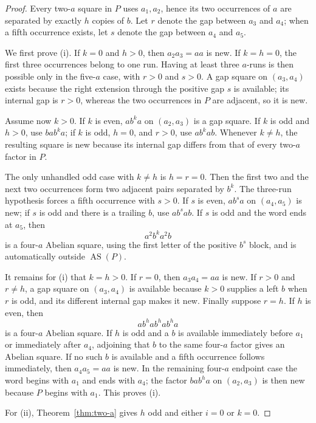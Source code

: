 \documentclass[11pt]{article}
\theoremstyle{definition}
\newcommand{\AS}{\operatorname{AS}}
\begin{document}
\begin{proof}
Every two-$a$ square in $P$ uses $a_1,a_2$, hence its two occurrences of $a$ are separated by exactly $h$ copies of $b$. Let $r$ denote the gap between $a_3$ and $a_4$; when a fifth occurrence exists, let $s$ denote the gap between $a_4$ and $a_5$.

We first prove (i). If $k=0$ and $h>0$, then $a_2a_3=aa$ is new. If $k=h=0$, the first three occurrences belong to one run. Having at least three $a$-runs is then possible only in the five-$a$ case, with $r>0$ and $s>0$. A gap square on $(a_3,a_4)$ exists because the right extension through the positive gap $s$ is available; its internal gap is $r>0$, whereas the two occurrences in $P$ are adjacent, so it is new.

Assume now $k>0$. If $k$ is even, $ab^k a$ on $(a_2,a_3)$ is a gap square. If $k$ is odd and $h>0$, use $bab^k a$; if $k$ is odd, $h=0$, and $r>0$, use $ab^k ab$. Whenever $k\ne h$, the resulting square is new because its internal gap differs from that of every two-$a$ factor in $P$.

The only unhandled odd case with $k\ne h$ is $h=r=0$. Then the first two and the next two occurrences form two adjacent pairs separated by $b^k$. The three-run hypothesis forces a fifth occurrence with $s>0$. If $s$ is even, $ab^s a$ on $(a_4,a_5)$ is new; if $s$ is odd and there is a trailing $b$, use $ab^s ab$. If $s$ is odd and the word ends at $a_5$, then
\[
 a^2b^k a^2b
\]
is a four-$a$ Abelian square, using the first letter of the positive $b^s$ block, and is automatically outside $\AS(P)$.

It remains for (i) that $k=h>0$. If $r=0$, then $a_3a_4=aa$ is new. If $r>0$ and $r\ne h$, a gap square on $(a_3,a_4)$ is available because $k>0$ supplies a left $b$ when $r$ is odd, and its different internal gap makes it new. Finally suppose $r=h$. If $h$ is even, then
\[
 ab^h ab^h ab^h a
\]
is a four-$a$ Abelian square. If $h$ is odd and a $b$ is available immediately before $a_1$ or immediately after $a_4$, adjoining that $b$ to the same four-$a$ factor gives an Abelian square. If no such $b$ is available and a fifth occurrence follows immediately, then $a_4a_5=aa$ is new. In the remaining four-$a$ endpoint case the word begins with $a_1$ and ends with $a_4$; the factor $bab^h a$ on $(a_2,a_3)$ is then new because $P$ begins with $a_1$. This proves (i).

For (ii), Theorem~\ref{thm:two-a} gives $h$ odd and either $i=0$ or $k=0$.


\end{proof}
\end{document}
